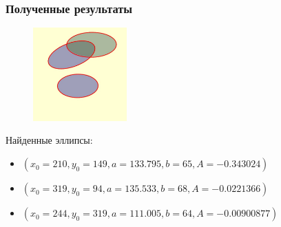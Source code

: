 \documentclass[14pt]{beamer}
\begin{document}

\begin{frame}
\frametitle{Полученные результаты}
\begin{figure} 
\vspace{-3ex}
\includegraphics[width=0.32\textwidth,left]{res}
\label{fig:res}
\end{figure}
Найденные эллипсы:
\small
\begin{itemize}
  \item $(x_0 = 210, y_0 = 149, a = 133.795, b = 65, A = -0.343024)$
  \item $(x_0 = 319, y_0 = 94, a = 135.533, b = 68, A = -0.0221366)$
  \item $(x_0 = 244, y_0 = 319, a = 111.005, b = 64, A = -0.00900877)$
\end{itemize}
\normalsize
\end{frame}
\end{document}
